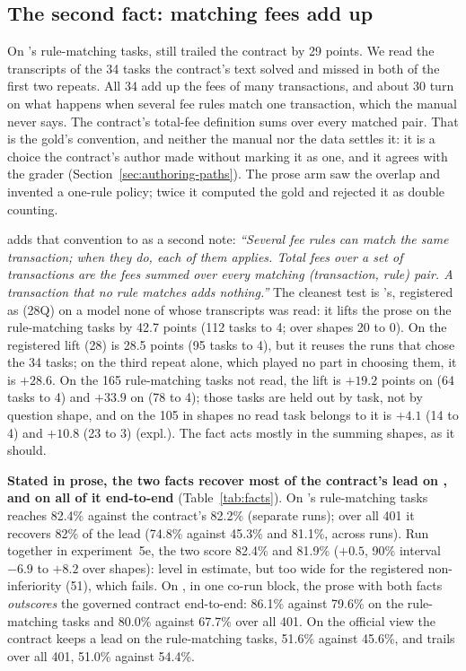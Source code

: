 \subsection{The second fact: matching fees add up}
\label{sec:second-fact}

On \mLuna{}'s rule-matching tasks, \armMw{} still trailed the contract by
29 points. We read the transcripts of the 34 tasks the contract's text
solved and \armMw{} missed in both of the first two repeats. All 34 add up
the fees of many transactions, and about 30 turn on what happens when
several fee rules match one transaction, which the manual never says. The
contract's total-fee definition sums over every matched pair. That is the
gold's convention, and neither the manual nor the data settles it: it is a
choice the contract's author made without marking it as one, and it
agrees with the grader (Section~\ref{sec:authoring-paths}). The prose arm
saw the overlap and invented a one-rule policy; twice it computed the gold
and rejected it as double counting.

\armMws{} adds that convention to \armMw{} as a second note:
\emph{``Several fee rules can match the same transaction; when they do,
each of them applies. Total fees over a set of transactions are the fees
summed over every matching (transaction, rule) pair. A transaction that no
rule matches adds nothing.''} The cleanest
test is \mQwen{}'s, registered as (28Q) on a model none of whose
transcripts was read: it lifts the prose on the rule-matching tasks by 42.7
points (112 tasks to 4; over shapes 20 to 0). On \mLuna{} the registered
lift (28) is 28.5 points (95 tasks to 4), but it reuses the runs that chose
the 34 tasks; on the third repeat alone, which played no part in choosing
them, it is $+28.6$. On the 165 rule-matching tasks not read, the lift is
$+19.2$ points on \mLuna{} (64 tasks to 4) and $+33.9$ on \mQwen{} (78 to
4); those tasks are held out by task, not by question shape, and on the
105 in shapes no read task belongs to it is $+4.1$ (14 to 4) and $+10.8$
(23 to 3) (expl.). The fact acts mostly in the summing shapes, as it
should.

\textbf{Stated in prose, the two facts recover most of the contract's
lead on \mLuna{}, and on \mQwen{} all of it end-to-end}
(Table~\ref{tab:facts}). On \mLuna{}'s rule-matching tasks \armMws{}
reaches 82.4\% against the contract's 82.2\% (separate runs); over all 401
it recovers 82\% of the lead (74.8\% against 45.3\% and 81.1\%, across
runs). Run together in experiment~5e, the two score 82.4\% and 81.9\%
($+0.5$, 90\% interval $-6.9$ to $+8.2$ over shapes): level in estimate,
but too wide for the registered non-inferiority (51), which fails. On \mQwen{}, in one co-run block, the
prose with both facts \emph{outscores} the governed contract end-to-end:
86.1\% against 79.6\% on the rule-matching tasks and 80.0\% against 67.7\%
over all 401. On the official view the contract keeps a lead on the
rule-matching tasks, 51.6\% against 45.6\%, and trails over all 401,
51.0\% against 54.4\%.

